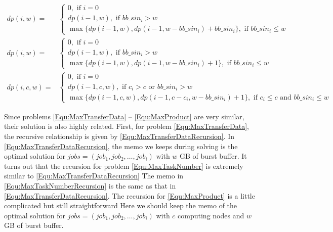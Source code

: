 \documentclass[conference,compsoc]{IEEEtran}
\begin{document}
\begin{strip}
        \begin{align}
                dp(i, w) = & 
                \left\{
                        \begin{array}{l}
                                0, \text{ if $i=0$ } \\ [1em]
                                dp(i-1, w), \text{ if $bb\_sin_i > w$} \\ [1em]
                                \max \{ dp(i-1, w), dp(i-1, w-bb\_sin_i) + bb\_sin_i \}, \text{ if $bb\_sin_i \leq w$}
                        \end{array} 
                \right.
                \label{Equ:MaxTransferDataRecursion} 
                \\[1em]
                dp(i, w) = &
                \left\{
                        \begin{array}{l}
                                0, \text{ if $i=0$ } \\ [1em]
                                dp(i-1, w), \text{ if $bb\_sin_i > w$} \\ [1em]
                                \max \{ dp(i-1, w), dp(i-1, w-bb\_sin_i) + 1 \}, \text{ if $bb\_sin_i \leq w$}
                        \end{array} 
                \right.
                \label{Equ:MaxTaskNumberRecursion}
                \\[1em]
                dp(i, c, w) = &
                \left\{
                        \begin{array}{l}
                                0, \text{ if $i=0$ } \\ [1em]
                                dp(i-1, c, w), \text{ if $c_i > c$ or $bb\_sin_i > w$} \\ [1em]
                                \max \{ dp(i-1, c, w), dp(i-1, c - c_i, w-bb\_sin_i) + 1 \}, \text{ if $c_i \leq c$ and $bb\_sin_i \leq w$}
                        \end{array} 
                \right.
                \label{Equ:MaxProductRecursion}
        \end{align}
\end{strip}

Since problems \ref{Equ:MaxTransferData} -- \ref{Equ:MaxProduct} are very similar, 
their solution is also highly related.
First, for problem \ref{Equ:MaxTransferData}, the recursive relationship is given by \ref{Equ:MaxTransferDataRecursion}.
In \ref{Equ:MaxTransferDataRecursion}, the memo we keeps during solving is the optimal solution for 
$jobs=(job_1, job_2, \ldots, job_i)$ with $w$ GB of burst buffer.
It turns out that the recursion for problem \ref{Equ:MaxTaskNumber} is extremely similar to \ref{Equ:MaxTransferDataRecursion}
The memo in \ref{Equ:MaxTaskNumberRecursion} is the same as that in \ref{Equ:MaxTransferDataRecursion}.
The recursion for \ref{Equ:MaxProduct} is a little complicated but still straightforward
Here we should keep the memo of the optimal solution for $jobs=(job_1, job_2, \ldots, job_i)$
with $c$ computing nodes and $w$ GB of burst buffer.
\end{document}
